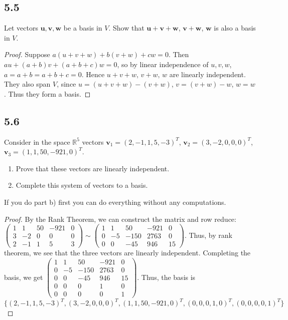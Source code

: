 \documentclass{amsart}
\begin{document}
\subsection*{5.5}
Let vectors $\mathbf{u}, \mathbf{v}, \mathbf{w}$ be a basis in $V$. Show that $\mathbf{u} + \mathbf{v} + \mathbf{w}$, $\mathbf{v} + \mathbf{w}$, $\mathbf{w}$ is also a basis in $V$.

\begin{proof}
Suppose $a(u+v+w) + b(v+w) + cw = 0$. Then $au + (a+b)v + (a+b+c)w = 0$, so by linear independence of $u,v,w$, $a = a+b = a+b+c = 0$. Hence $u+v+w,\, v+w,\, w$ are linearly independent. They also span $V$, since $u = (u+v+w)-(v+w)$, $v = (v+w)-w$, $w = w$. Thus they form a basis.
\end{proof}

\subsection*{5.6}
Consider in the space $\mathbb{R}^5$ vectors $\mathbf{v}_1 = (2, -1, 1, 5, -3)^T$, $\mathbf{v}_2 = (3, -2, 0, 0, 0)^T$, $\mathbf{v}_3 = (1, 1, 50, -921, 0)^T$.
\begin{enumerate}[label=\alph*)]
  \item Prove that these vectors are linearly independent.
  \item Complete this system of vectors to a basis.
\end{enumerate}
If you do part b) first you can do everything without any computations.

\begin{proof}
  By the Rank Theorem, we can construct the matrix and row reduce:\\ $\begin{pmatrix}
    1 & 1 & 50 & -921 & 0 \\ 
    3 & -2 &0&0 & 0 \\ 
    2 & -1 & 1 & 5 & 3
  \end{pmatrix} \sim \begin{pmatrix}
    1 & 1 & 50 & -921 & 0 \\ 
    0 & -5 & -150 &  2763 & 0 \\ 
    0 & 0 & -45 & 946 & 15
  \end{pmatrix}$.
  Thus, by rank theorem, we see that the three vectors are linearly independent. Completing the basis, we get $\begin{pmatrix}
    1 & 1 & 50 & -921 & 0 \\ 
    0 & -5 & -150 &  2763 & 0 \\ 
    0 & 0 & -45 & 946 & 15 \\ 
    0 & 0 & 0 & 1 & 0 \\ 
   0 & 0 & 0 & 0 & 1 
  \end{pmatrix}$. Thus, the basis is \\$\{(2, -1, 1, 5, -3)^T,(3, -2, 0, 0, 0)^T,(1, 1, 50, -921, 0)^T, (0,0,0,1,0)^T, (0,0,0,0,1)^T\}$
\end{proof}
\end{document}
